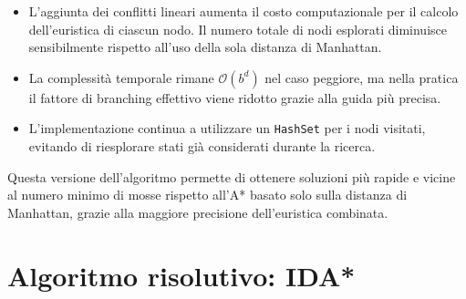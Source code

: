 \begin{itemize}
    \item L'aggiunta dei conflitti lineari aumenta il costo computazionale per il calcolo dell'euristica di ciascun nodo. Il numero totale di nodi esplorati diminuisce sensibilmente rispetto all'uso della sola distanza di Manhattan.
    \item La complessità temporale rimane $\mathcal{O}(b^d)$ nel caso peggiore, ma nella pratica il fattore di branching effettivo viene ridotto grazie alla guida più precisa.
    \item L'implementazione continua a utilizzare un \texttt{HashSet} per i nodi visitati, evitando di riesplorare stati già considerati durante la ricerca.
\end{itemize}
Questa versione dell'algoritmo permette di ottenere soluzioni più rapide e vicine al numero minimo di mosse rispetto all'A* basato solo sulla distanza di Manhattan, grazie alla maggiore precisione dell'euristica combinata.

\section{Algoritmo risolutivo: IDA*}

